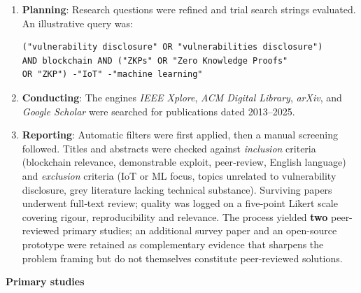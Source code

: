 \begin{enumerate}[label=\texttt{(\roman*)}]
    \item \textbf{Planning}: Research questions were refined and trial search strings evaluated.  
          An illustrative query was:
\begin{verbatim}
("vulnerability disclosure" OR "vulnerabilities disclosure")
AND blockchain AND ("ZKPs" OR "Zero Knowledge Proofs"
OR "ZKP") -"IoT" -"machine learning"
\end{verbatim}

    \item \textbf{Conducting}: The engines \textit{IEEE Xplore}, \textit{ACM Digital Library}, \textit{arXiv}, and \textit{Google Scholar} were searched for publications dated 2013–2025.

    \item \textbf{Reporting}: Automatic filters were first applied, then a manual screening followed.  
          Titles and abstracts were checked against \textit{inclusion} criteria (blockchain relevance, demonstrable exploit, peer‑review, English language) and \textit{exclusion} criteria (IoT or ML focus, topics unrelated to vulnerability disclosure, grey literature lacking technical substance).  
          Surviving papers underwent full‑text review; quality was logged on a five‑point Likert scale covering rigour, reproducibility and relevance.  
           The process yielded \textbf{two} peer-reviewed primary studies; an additional survey paper and an open-source prototype were retained as complementary evidence that sharpens the problem framing but do not themselves constitute peer-reviewed solutions.
\end{enumerate}

\vspace{1em}
\noindent\textbf{Primary studies}

